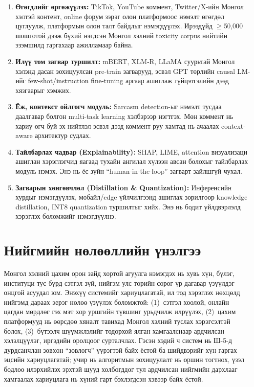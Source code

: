\begin{enumerate}
  \item \textbf{Өгөгдлийг өргөжүүлэх:} TikTok, YouTube коммент, Twitter/X-ийн
    Монгол хэлтэй контент, online форум зэрэг олон платформоос нэмэлт
    өгөгдөл цуглуулж, платформын олон талт байдлыг нэмэгдүүлэх. Ирээдүйд
    $\geq$50,000 шошготой дээж бүхий нэгдсэн Монгол хэлний toxicity corpus
    нийтийн эзэмшилд гаргахаар ажилламаар байна.
  \item \textbf{Илүү том загвар туршилт:} mBERT, XLM-R, LLaMA суурьтай
    Монгол хэлэнд дасан зохицуулсан pre-train загварууд, эсвэл GPT
    төрлийн causal LM-ийг few-shot/instruction fine-tuning аргаар
    ашиглаж гүйцэтгэлийн дээд хязгаарыг хэмжих.
  \item \textbf{Ёж, контекст ойлгогч модуль:} Sarcasm detection-ыг нэмэлт
    тусдаа даалгавар болгон multi-task learning хэлбэрээр нэгтгэх. Мөн
    коммент нь хариу өгч буй эх нийтлэл эсвэл дээд коммент руу хамтад нь
    ачаалах context-aware архитектур судлах.
  \item \textbf{Тайлбарлах чадвар (Explainability):} SHAP, LIME, attention
    визуализаци ашиглан хэрэглэгчид яагаад тухайн ангилал хүлээн авсан
    болохыг тайлбарлах модуль нэмэх. Энэ нь ёс зүйн ``human-in-the-loop''
    загварт зайлшгүй чухал.
  \item \textbf{Загварын хөнгөвчлөл (Distillation \& Quantization):}
    Инференсийн хурдыг нэмэгдүүлэх, мобайл/edge үйлчилгээнд ашиглах
    зорилгоор knowledge distillation, INT8 quantization туршилтыг
    хийх. Энэ нь бодит үйлдвэрлэлд хэрэглэх боломжийг нэмэгдүүлнэ.
\end{enumerate}

\section{Нийгмийн нөлөөллийн үнэлгээ}

Монгол хэлний цахим орон зайд хортой агуулга нэмэгдэх нь хувь хүн, бүлэг,
институци тус бүрд сэтгэл зүй, нийгэм-улс төрийн сөрөг үр дагавар үзүүлдэг
онцгой асуудал юм. Энэхүү системийг хариуцлагатай, ил тод хэрэглэх нөхцөлд
нийгэмд дараах эерэг нөлөө үзүүлэх боломжтой: (1)~сэтгэл хоолой, онлайн
цагдан мөрдлөг гэх мэт хор уршгийн түвшинг урьдчилж илрүүлэх, (2)~цахим
платформууд нь өөрсдөө хяналт тавихад Монгол хэлний туслах хэрэгсэлтэй
болох, (3)~бүтээлч шүүмжлэлийг тодорхой ялган хамгаалснаар ардчилсан
хэлэлцүүлэг, иргэдийн оролцоог сурталчлах. Гэсэн хэдий ч систем нь Ш-5-д
дурдсанчлан зөвхөн ``зөвлөгч'' үүрэгтэй байх ёстой ба шийдвэрийг хүн
гаргах эцсийн хариуцлагатай; учир нь алгоритмын зохицуулалт нь оршин тогтнох,
үзэл бодлоо илэрхийлэх эрхтэй шууд холбогддог тул ардчилсан нийгмийн дархлааг
хамгаалах хариуцлага нь хүний гарт бэхлэгдсэн хэвээр байх ёстой.

